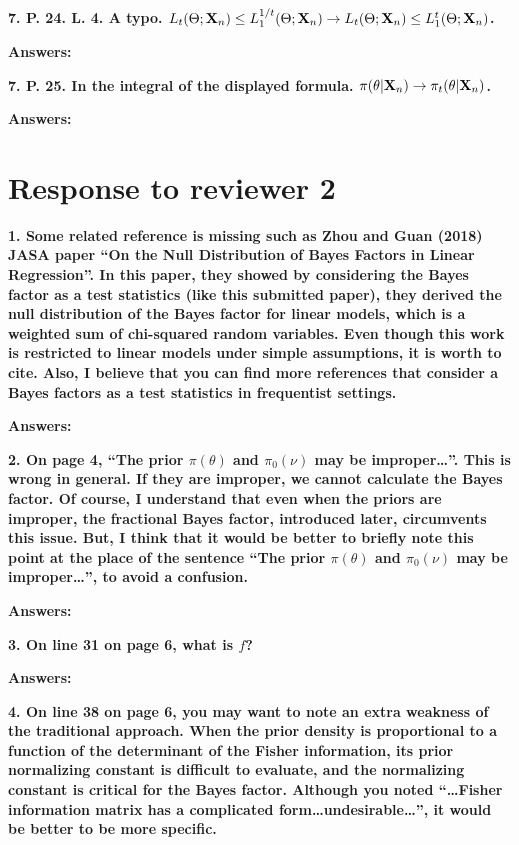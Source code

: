 \documentclass[11pt]{article}
\theoremstyle{plain}
\theoremstyle{definition}
\theoremstyle{remark}
\begin{document}
\textbf{
7.
P. 24. L. 4.
A typo.
$L_t (\Theta ; \mathbf{X}_n) \leq L_1^{1/t}(\Theta ; \mathbf{X}_n) \rightarrow  L_t (\Theta ; \mathbf{X}_n) \leq L_1^{t}(\Theta ; \mathbf{X}_n) $.
}


\textbf{Answers:}



\textbf{
7.
P. 25.
In the integral of the displayed formula. $\pi(\theta | \mathbf{X}_n) \rightarrow \pi_t (\theta | \mathbf{X}_n)$.
}


\textbf{Answers:}




\section{Response to reviewer 2}
\textbf{
    1.
    Some related reference is missing such as Zhou and Guan (2018) JASA paper “On the Null Distribution of Bayes Factors in Linear Regression”.
    In this paper, they showed by considering the Bayes factor as a test statistics (like this submitted paper), they derived the null distribution of the Bayes factor for linear models, which is a weighted sum of chi-squared random variables.
    Even though this work is restricted to linear models under simple assumptions, it is worth to cite.
    Also, I believe that you can find more references that consider a Bayes factors as a test statistics in frequentist settings.
}

\textbf{Answers:}



\textbf{
    2.
    On page 4, ``The prior $\pi(\theta)$ and $\pi_0 (\nu)$ may be improper\dots''.
    This is wrong in general.
    If they are improper, we cannot calculate the Bayes factor.
    Of course, I understand that even when the priors are improper, the fractional Bayes factor, introduced later, circumvents this issue.
    But, I think that it would be better to briefly note this point at the place of the sentence ``The prior $\pi(\theta)$ and $\pi_0 (\nu)$ may be improper\dots'', to avoid a confusion.
}

\textbf{Answers:}



\textbf{
    3. On line 31 on page 6, what is $f$?
}

\textbf{Answers:}




\textbf{
    4. On line 38 on page 6, you may want to note an extra weakness of the traditional approach.
    When the prior density is proportional to a function of the determinant of the Fisher information, its prior normalizing constant is difficult to evaluate, and the normalizing constant is critical for the Bayes factor.
    Although you noted ``\dots Fisher information matrix has a complicated form\dots undesirable\dots'', it would be better to be more specific.
}
\end{document}
